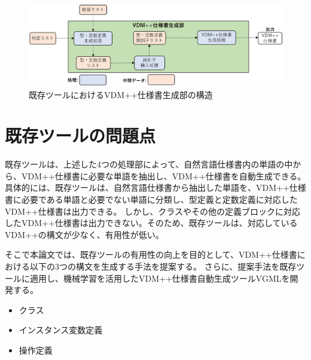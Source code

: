 \begin{figure}[tp]
    \begin{center}
        \includegraphics[width=1.0\columnwidth]{image/exis_generator_structure.png}
        \caption{既存ツールにおけるVDM++仕様書生成部の構造}
        \label{fig:exis_generator_structure}
    \end{center}
\end{figure}

\section{既存ツールの問題点}
\label{sec:problem}
既存ツールは、上述した4つの処理部によって、自然言語仕様書内の単語の中から、VDM++仕様書に必要な単語を抽出し、VDM++仕様書を自動生成できる。
具体的には、既存ツールは、自然言語仕様書から抽出した単語を、VDM++仕様書に必要である単語と必要でない単語に分類し、型定義と定数定義に対応したVDM++仕様書は出力できる。
しかし、クラスやその他の定義ブロックに対応したVDM++仕様書は出力できない。そのため、既存ツールは、対応しているVDM++の構文が少なく、有用性が低い。

そこで本論文では、既存ツールの有用性の向上を目的として、VDM++仕様書における以下の3つの構文を生成する手法を提案する。
さらに、提案手法を既存ツールに適用し、機械学習を活用したVDM++仕様書自動生成ツールVGMLを開発する。

\begin{itemize}
    \item クラス
    \item インスタンス変数定義
    \item 操作定義
\end{itemize}

